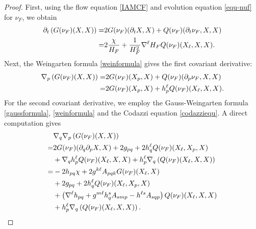 \documentclass[11pt,reqno]{amsart}
\theoremstyle{definition}
\theoremstyle{remark}
\numberwithin{equation}{section}
\begin{document}
\begin{proof}
		First, using the flow equation \eqref{IAMCF} and evolution equation \eqref{equ-nuf} for $\nu_F$, we obtain
		\begin{align}
			\partial_t \left( G(\nu_F)(X,X) \right) =& 2 G(\nu_F)(\partial_t X,X) + 	Q(\nu_F)(\partial_t\nu_F,X,X) \notag\\
			=& 2 \dfrac{\chi}{H_F} + \dfrac{1}{H_F^2}\nabla^{\ell} H_F Q(\nu_F)(X_\ell,X,X).  \label{equ-ptg}
		\end{align}
		Next, the Weingarten formula \eqref{weinformula} gives the first covariant derivative:
		\begin{align}
			\nabla_p\left( G(\nu_F)(X,X) \right) =& 2G(\nu_F)(X_p,X) + Q(\nu_F)(\partial_p \nu_F,X,X) \notag\\
			=& 2G(\nu_F)(X_p,X) + h^{\ell}_p Q(\nu_F)(X_{\ell},X,X). \label{equ-dpg}
		\end{align}		
		For the second covariant derivative, we employ the Gauss-Weingarten formula \eqref{gaussformula}, \eqref{weinformula} and the Codazzi equation \eqref{codazziequ}. A direct computation gives
		\begin{align}
			&\nabla_q\nabla_p\left( G(\nu_F)(X,X) \right) \notag\\
			=& 2G(\nu_F)(\partial_q\partial_p X,X) + 2g_{pq} + 2h_q^{\ell}Q(\nu_F)(X_{\ell},X_p, X) \notag\\
			&+ \nabla_qh^{\ell}_p Q(\nu_F)(X_{\ell},X,X) + h^{\ell}_p \nabla_q \left(Q(\nu_F)(X_{\ell},X,X)\right) \notag\\
			=& -2h_{pq}\chi + 2g^{k\ell}A_{pqk}G(\nu_F)(X_{\ell},X)\nonumber\\
			&+2g_{pq} + 2h_q^{\ell}Q(\nu_F)(X_{\ell},X_p, X)\notag\\
			&+\left( \nabla^{\ell}h_{pq} + g^{m\ell}h^s_q A_{smp} - h^{\ell s}A_{sqp} \right)Q(\nu_F)(X_{\ell},X,X) \notag\\
			& + h^{\ell}_p\nabla_q\left( Q(\nu_F)(X_{\ell},X,X) \right). \label{equ-hessg}
		\end{align}
		

\end{proof}
\end{document}
